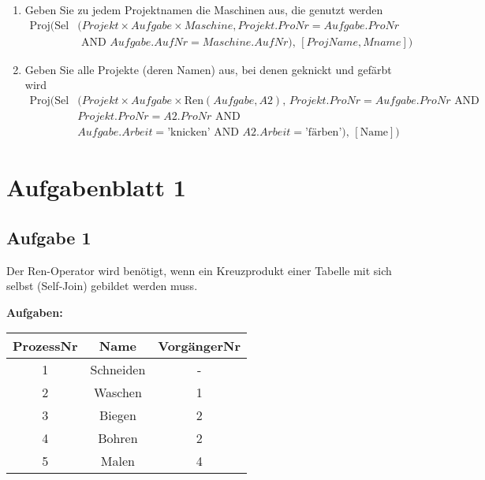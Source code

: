 \begin{enumerate}
    \item Geben Sie zu jedem Projektnamen die Maschinen aus, die genutzt werden
        \begin{align*}
            \text{Proj}\bigl(
            \text{Sel}&(Projekt \times Aufgabe \times Maschine, Projekt.ProNr = Aufgabe.ProNr \\ 
            &\text{ AND } Aufgabe.AufNr = Maschine.AufNr),\, [ProjName, Mname]
            \bigr)
        \end{align*}

    \item Geben Sie alle Projekte (deren Namen) aus, bei denen geknickt und gefärbt wird
        \begin{align*}
            \text{Proj}\bigl(
            \text{Sel}&(Projekt \times Aufgabe \times \text{Ren}(Aufgabe, A2),\, 
            Projekt.ProNr = Aufgabe.ProNr \text{ AND } \\
            &Projekt.ProNr = A2.ProNr \text{ AND } \\
            &Aufgabe.Arbeit = \text{'knicken'} \text{ AND } A2.Arbeit = \text{'färben'}),\, 
            [\text{Name}]
            \bigr)
        \end{align*}
\end{enumerate}

\newpage
\section{Aufgabenblatt 1}
\subsection{Aufgabe 1}
Der Ren-Operator wird benötigt, wenn ein Kreuzprodukt einer Tabelle mit sich selbst (Self-Join) gebildet werden muss.

    \begin{table}[H]
        \centering
        \textbf{Aufgaben:} \\ [10pt]
        \begin{tabular}{|c|c|c|}
            \hline
            \textbf{ProzessNr} & \textbf{Name} & \textbf{VorgängerNr} \\
            \hline
            1 & Schneiden   & - \\
            2 & Waschen     & 1 \\
            3 & Biegen      & 2 \\
            4 & Bohren      & 2 \\
            5 & Malen       & 4\\
            \hline
        \end{tabular}
    \end{table}

